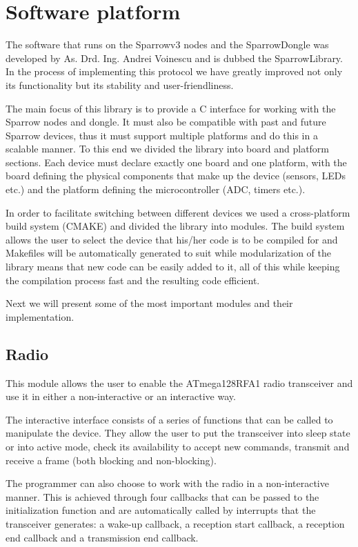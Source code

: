 
\chapter{Software platform}

The software that runs on the Sparrowv3 nodes and the SparrowDongle was
developed by As. Drd. Ing. Andrei Voinescu and is dubbed the SparrowLibrary.
In the process of implementing this protocol we have greatly improved not only
its functionality but its stability and user-friendliness.

The main focus of this library is to provide a C interface for working with the
Sparrow nodes and dongle. It must also be compatible with past and future
Sparrow devices, thus it must support multiple platforms and do this in a
scalable manner. To this end we divided the library into board and platform
sections.  Each device must declare exactly one board and one platform, with
the board defining the physical components that make up the device (sensors,
LEDs etc.) and the platform defining the microcontroller (ADC, timers etc.). 

In order to facilitate switching between different devices we used a
cross-platform build system (CMAKE) and divided the library into modules. The
build system allows the user to select the device that his/her code is to be
compiled for and Makefiles will be automatically generated to suit while
modularization of the library means that new code can be easily added to it, all
of this while keeping the compilation process fast and the resulting code
efficient.

Next we will present some of the most important modules and their
implementation.

\section{Radio}

This module allows the user to enable the ATmega128RFA1 radio transceiver and
use it in either a non-interactive or an interactive way. 

The interactive interface consists of a series of functions that can be called
to manipulate the device. They allow the user to put the transceiver into 
sleep state or into active mode, check its availability to accept new
commands, transmit and receive a frame (both blocking and non-blocking).

The programmer can also choose to work with the radio in a non-interactive
manner. This is achieved through four callbacks that can be passed to the
initialization function and are automatically called by interrupts that the
transceiver generates: a wake-up callback, a reception start callback, a
reception end callback and a transmission end callback. 

